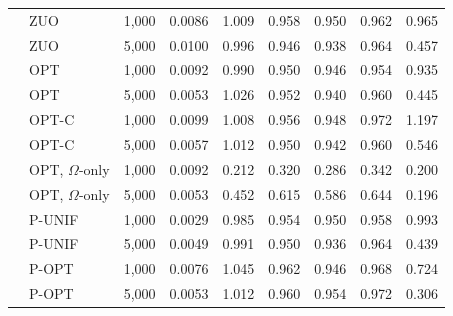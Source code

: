 \begin{tabular}{llrrrrrrr}
 & ZUO & 1,000 & 0.0086 & 1.009 & 0.958 & 0.950 & 0.962 & 0.965\\
 & ZUO & 5,000 & 0.0100 & 0.996 & 0.946 & 0.938 & 0.964 & 0.457\\
 & OPT & 1,000 & 0.0092 & 0.990 & 0.950 & 0.946 & 0.954 & 0.935\\
 & OPT & 5,000 & 0.0053 & 1.026 & 0.952 & 0.940 & 0.960 & 0.445\\
 & OPT-C & 1,000 & 0.0099 & 1.008 & 0.956 & 0.948 & 0.972 & 1.197\\
 & OPT-C & 5,000 & 0.0057 & 1.012 & 0.950 & 0.942 & 0.960 & 0.546\\
 & OPT, \(\Omega\)-only & 1,000 & 0.0092 & 0.212 & 0.320 & 0.286 & 0.342 & 0.200\\
 & OPT, \(\Omega\)-only & 5,000 & 0.0053 & 0.452 & 0.615 & 0.586 & 0.644 & 0.196\\
 & P-UNIF & 1,000 & 0.0029 & 0.985 & 0.954 & 0.950 & 0.958 & 0.993\\
 & P-UNIF & 5,000 & 0.0049 & 0.991 & 0.950 & 0.936 & 0.964 & 0.439\\
 & P-OPT & 1,000 & 0.0076 & 1.045 & 0.962 & 0.946 & 0.968 & 0.724\\
 & P-OPT & 5,000 & 0.0053 & 1.012 & 0.960 & 0.954 & 0.972 & 0.306\\
\bottomrule
\end{tabular}
